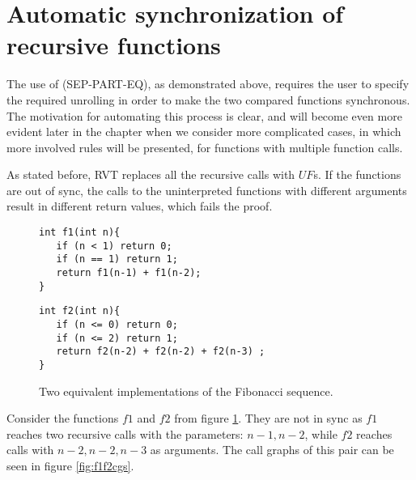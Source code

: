 \section{Automatic synchronization of recursive functions}
The use of (SEP-PART-EQ), as demonstrated above, requires the user to specify the required unrolling in order to make the two compared functions synchronous. The motivation for automating this process is clear, and will become even more evident later in the chapter when we consider more complicated cases, in which more involved rules will be presented, for functions with multiple function calls. 

As stated before, RVT replaces all the recursive calls with $UF$s. If the functions are out of sync, the calls to the uninterpreted functions with different arguments result in different return values, which fails the proof.
\begin{figure}[h]
\begin{center}
\begin{minipage}{7 cm}
\begin{lstlisting}
int f1(int n){
   if (n < 1) return 0;
   if (n == 1) return 1; 
   return f1(n-1) + f1(n-2);
}
\end{lstlisting}
\end{minipage}
\begin{minipage}{7 cm}
\begin{lstlisting}
int f2(int n){
   if (n <= 0) return 0;
   if (n <= 2) return 1;
   return f2(n-2) + f2(n-2) + f2(n-3) ;
}
\end{lstlisting}
\end{minipage}
\caption{Two equivalent implementations of the Fibonacci sequence.}
\label{fig:f1f2}
\end{center}
\end{figure}
Consider the functions $f1$ and $f2$ from figure \ref{fig:f1f2}. They are not in sync as $f1$ reaches two recursive calls with the parameters: $n-1,n-2$, while $f2$ reaches calls with $n-2,n-2,n-3$ as arguments. The call graphs of this pair can be seen in figure \ref{fig:f1f2cgs}.

